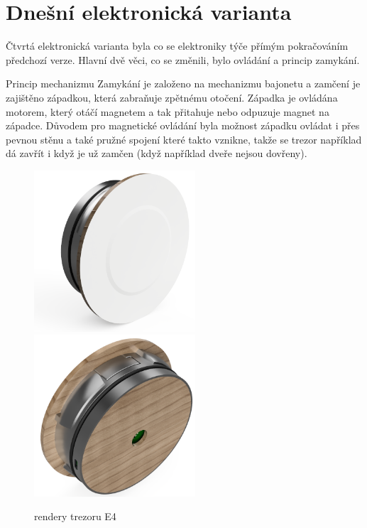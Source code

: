 \section{Dnešní elektronická varianta}

Čtvrtá elektronická varianta byla co se elektroniky týče přímým pokračováním předchozí verze. 
Hlavní dvě věci, co se změnili, bylo ovládání a princip zamykání. 

Princip mechanizmu
Zamykání je založeno na mechanizmu bajonetu a zamčení je zajištěno západkou, která zabraňuje zpětnému otočení.
Západka je ovládána motorem, který otáčí magnetem a tak přitahuje nebo odpuzuje magnet na západce. Důvodem pro magnetické ovládání
byla možnost západku ovládat i přes pevnou stěnu a také pružné spojení které takto vznikne, takže se trezor například dá zavřít i když
je už zamčen (když například dveře nejsou dovřeny).

\begin{figure}[htbp]
    \centering
    \includegraphics[width=170pt]{kapitoly/obrazky/E4/predni_render.png}
    \includegraphics[width=170pt]{kapitoly/obrazky/E4/zadni_render.png}
    \caption{rendery trezoru E4}
    \label{fig:E4-render}
\end{figure}

